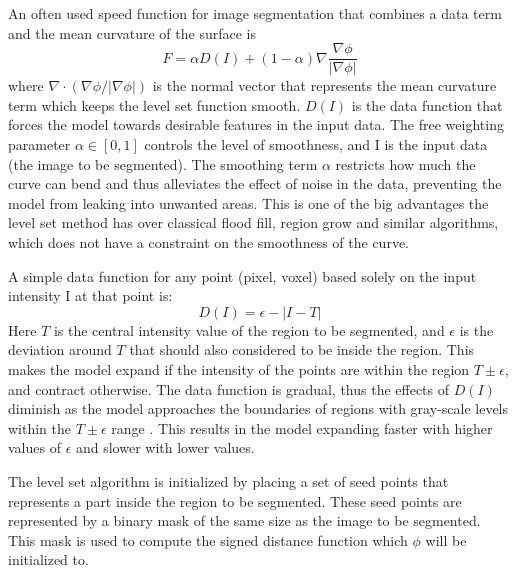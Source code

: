 An often used speed function for image segmentation that combines a data term and the mean curvature of the surface is \cite{cates03,lefohn04}
\begin{equation}
F = \alpha D(I) + (1-\alpha) \nabla \frac{\nabla \phi}{|\nabla \phi|}
\end{equation} 
where \(\nabla \cdot (\nabla \phi / |\nabla \phi|)\) is the normal vector that represents the mean curvature term which keeps the level set function smooth. \(D(I)\) is the data function that forces the model towards desirable features in the input data. The free weighting parameter \(\alpha \in{[0,1]}\) controls the level of smoothness, and I is the input data (the image to be segmented). The smoothing term \(\alpha\) restricts how much the curve can bend and thus alleviates the effect of noise in the data, preventing the model from leaking into unwanted areas\cite{lefohn04}. This is one of the big advantages the level set method has over classical flood fill, region grow and similar algorithms, which does not have a constraint on the smoothness of the curve.

A simple data function for any point (pixel, voxel) based solely on the input intensity I at that point\cite{cates03,lefohn04} is:
\begin{equation}
D(I) = \epsilon - |I - T|
\end{equation} 
Here \(T\) is the central intensity value of the region to be segmented, and \(\epsilon\) is the deviation around \(T\) that should also considered to be inside the region. This makes the model expand if the intensity of the points are within the region \(T \pm \epsilon\), and contract otherwise. The data function is gradual, thus the effects of \(D(I)\) diminish as the model approaches the boundaries of regions with gray-scale levels within the \(T \pm \epsilon\) range \cite{lefohn04}. This results in the model expanding faster with higher values of \(\epsilon\) and slower with lower values. 

The level set algorithm is initialized by placing a set of seed points that represents a part inside the region to be segmented. These seed points are represented by a binary mask of the same size as the image to be segmented. This mask is used to compute the signed distance function which \(\phi\) will be initialized to. 

